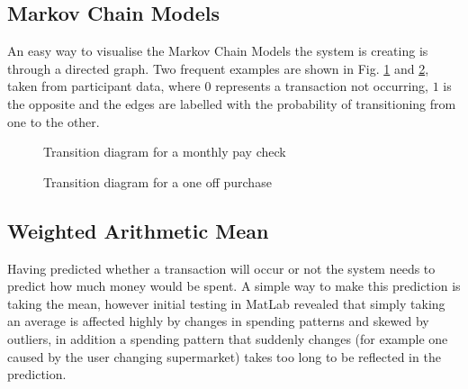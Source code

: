 \subsection{Markov Chain Models}

An easy way to visualise the Markov Chain Models the system is creating is through a directed graph. Two frequent examples are shown in Fig. \ref{fig:transition-monthly} and \ref{fig:transition-one}, taken from participant data, where $0$ represents a transaction not occurring, $1$ is the opposite and the edges are labelled with the probability of transitioning from one to the other. 

\begin{figure}[h]
\centering
{}
\caption{Transition diagram for a monthly pay check}
\label{fig:transition-monthly}
\end{figure}

\begin{figure}[h]
\centering
{}
\caption{Transition diagram for a one off purchase}
\label{fig:transition-one}
\end{figure}

\subsection{Weighted Arithmetic Mean}
Having predicted whether a transaction will occur or not the system needs to predict how much money would be spent. A simple way to make this prediction is taking the mean, however initial testing in MatLab revealed that simply taking an average is affected highly by changes in spending patterns and skewed by outliers, in addition a spending pattern that suddenly changes (for example one caused by the user changing supermarket) takes too long to be reflected in the prediction.

